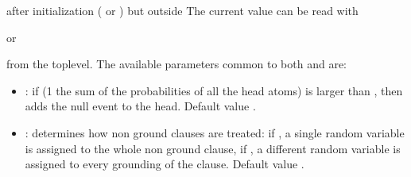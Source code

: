 \documentclass[letterpaper,10pt,english]{sphinxmanual}
\begin{document}
\sphinxAtStartPar
after initialization ( or ) but outside 
The current value can be read with

\begin{sphinxVerbatim}[commandchars=\\\{\}]
 
\end{sphinxVerbatim}

\sphinxAtStartPar
or

\begin{sphinxVerbatim}[commandchars=\\\{\}]
 
\end{sphinxVerbatim}

\sphinxAtStartPar
from the top\sphinxhyphen{}level.
The available parameters common to both  and  are:
\begin{itemize}
\item {} 
\sphinxAtStartPar
{}: if (1 \sphinxhyphen{} the sum of the probabilities of all the head atoms) is larger than , then  adds the null event to the head. Default value .

\item {} 
\sphinxAtStartPar
{}: determines how non ground clauses are treated: if , a single random variable is assigned to the whole non ground clause, if , a different random variable is assigned to every grounding of the clause. Default value .

\end{itemize}
\end{document}
